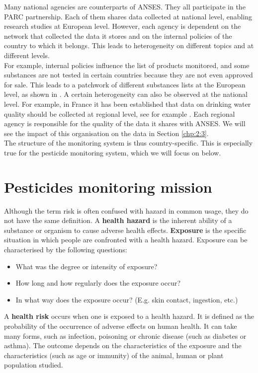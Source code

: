 Many national agencies are counterparts of ANSES. They all participate in the PARC partnership. Each of them shares data collected at national level, enabling research studies at European level. However, each agency is dependent on the network that collected the data it stores and on the internal policies of the country to which it belongs. This leads to heterogeneity on different topics and at different levels. \\
For example, internal policies influence the list of products monitored, and some substances are not tested in certain countries because they are not even approved for sale. This leads to a patchwork of different substances lists at the European level, as shown in \cite{Baran2022}. A certain heterogeneity can also be observed at the national level. For example, in France it has been established that data on drinking water quality should be collected at regional level, see for example \cite{Baran2022}. Each regional agency is responsible for the quality of the data it shares with ANSES. We will see the impact of this organisation on the data in Section \ref{chp:2:3}. \\
The structure of the monitoring system is thus country-specific. This is especially true for the pesticide monitoring system, which we will focus on below.

\section{Pesticides monitoring mission}\label{chp:2:2}

Although the term risk is often confused with hazard in common usage, they do not have the same definition. A \textbf{health hazard} is the inherent ability of a substance or organism to cause adverse health effects. \textbf{Exposure} is the specific situation in which people are confronted with a health hazard. Exposure can be characterised by the following questions:
\begin{itemize}
\item What was the degree or intensity of exposure?
\item How long and how regularly does the exposure occur? 
\item In what way does the exposure occur? (E.g. skin contact, ingestion, etc.)
\end{itemize}
A \textbf{health risk} occurs when one is exposed to a health hazard. It is defined as the probability of the occurrence of adverse effects on human health. It can take many forms, such as infection, poisoning or chronic disease (such as diabetes or asthma). The outcome depends on the characteristics of the exposure and the characteristics (such as age or immunity) of the animal, human or plant population studied.

